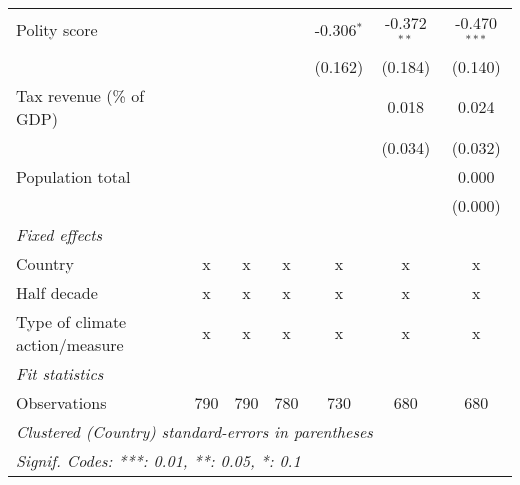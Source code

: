 \begin{tabular}{lcccccc}
   Polity score                                               &                &                &               & -0.306$^{*}$   & -0.372$^{**}$  & -0.470$^{***}$\\   
                                                              &                &                &               & (0.162)        & (0.184)        & (0.140)\\   
   Tax revenue (\% of GDP)                                    &                &                &               &                & 0.018          & 0.024\\   
                                                              &                &                &               &                & (0.034)        & (0.032)\\   
   Population total                                           &                &                &               &                &                & 0.000\\   
                                                              &                &                &               &                &                & (0.000)\\   
   \emph{Fixed effects}\\
   Country                                                    & x              & x              & x             & x              & x              & x\\  
   Half decade                                                & x              & x              & x             & x              & x              & x\\  
   Type of climate action/measure                             & x              & x              & x             & x              & x              & x\\  
   \midrule \emph{Fit statistics}\\
   Observations                                               & 790            & 790            & 780           & 730            & 680            & 680\\  
   \midrule
   \multicolumn{7}{l}{\emph{Clustered (Country) standard-errors in parentheses}}\\
   \multicolumn{7}{l}{\emph{Signif. Codes: ***: 0.01, **: 0.05, *: 0.1}}\\
\end{tabular}
\par\endgroup


